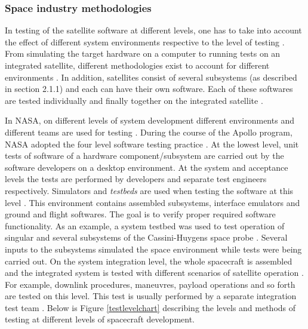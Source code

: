 \documentclass[english,12pt,a4paper,pdftex,elec,utf8]{aaltothesis}
\begin{document}
\subsubsection{Space industry methodologies}
In testing of the satellite software at different levels, one has to take into account the effect of different system environments respective to the level of testing \cite{embeddedsofteng, softacceptancespace}. From simulating the target hardware on a computer to running tests on an integrated satellite, different methodologies exist to account for different environments \cite{softacceptancespace}. In addition, satellites consist of several subsystems (as described in section 2.1.1) and each can have their own software. Each of these softwares are tested individually and finally together on the integrated satellite \cite{sularikurssi, softacceptancespace}.\par
In NASA, on different levels of system development different environments and different teams are used for testing \cite{softacceptancespace}. During the course of the Apollo program, NASA adopted the four level software testing practice \cite{compinspace}. At the lowest level, unit tests of software of a hardware component/subsystem are carried out by the software developers on a desktop environment. At the system and acceptance levels the tests are performed by developers and separate test engineers respectively. Simulators and \textit{testbeds} are used when testing the software at this level \cite{softacceptancespace, cassinitestbed}. This environment contains assembled subsystems, interface emulators and ground and flight softwares. The goal is to verify proper required software functionality. As an example, a system testbed was used to test operation of singular and several subsystems of the Cassini-Huygens space probe \cite{cassinitestbed}. Several inputs to the subsystems simulated the space environment while tests were being carried out. On the system integration level, the whole spacecraft is assembled and the integrated system is tested with different scenarios of satellite operation \cite{softacceptancespace, tor}. For example, downlink procedures, maneuvres, payload operations and so forth are tested on this level. This test is usually performed by a separate  integration test team \cite{softacceptancespace}. Below is Figure \ref{testlevelchart} describing the levels and methods of testing at different levels of spacecraft development. \par
\end{document}
